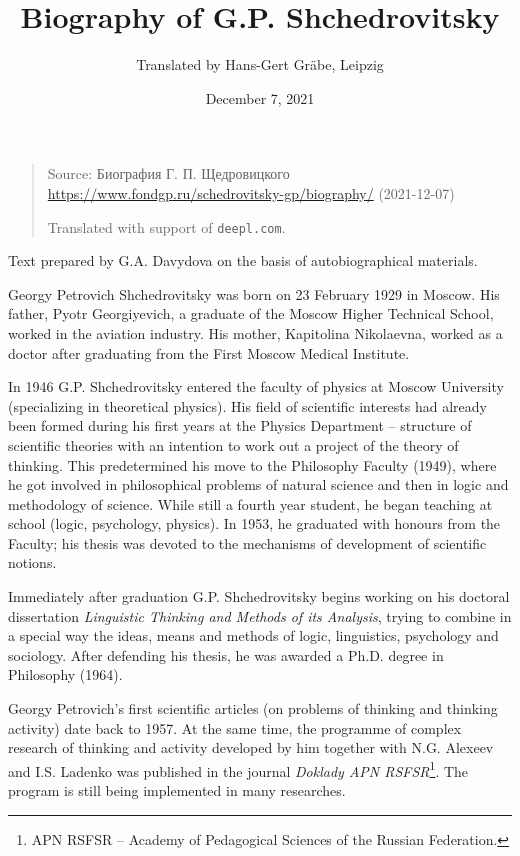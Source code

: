 \documentclass[a4paper,11pt]{article}
\title{Biography of G.P. Shchedrovitsky}
\author{Translated by Hans-Gert Gräbe, Leipzig}
\date{December 7, 2021}
\begin{document}
\maketitle

\begin{quote}
  Source: \foreignlanguage{russian}{ Биография Г. П. Щедровицкого}\\
  \url{https://www.fondgp.ru/schedrovitsky-gp/biography/} (2021-12-07)

  Translated with support of \texttt{deepl.com}.
\end{quote}

Text prepared by G.A. Davydova on the basis of autobiographical materials.

Georgy Petrovich Shchedrovitsky was born on 23 February 1929 in Moscow. His
father, Pyotr Georgiyevich, a graduate of the Moscow Higher Technical School,
worked in the aviation industry. His mother, Kapitolina Nikolaevna, worked as
a doctor after graduating from the First Moscow Medical Institute.

In 1946 G.P. Shchedrovitsky entered the faculty of physics at Moscow
University (specializing in theoretical physics). His field of scientific
interests had already been formed during his first years at the Physics
Department -- structure of scientific theories with an intention to work out a
project of the theory of thinking. This predetermined his move to the
Philosophy Faculty (1949), where he got involved in philosophical problems of
natural science and then in logic and methodology of science. While still a
fourth year student, he began teaching at school (logic, psychology, physics).
In 1953, he graduated with honours from the Faculty; his thesis was devoted to
the mechanisms of development of scientific notions.

Immediately after graduation G.P. Shchedrovitsky begins working on his
doctoral dissertation \emph{Linguistic Thinking and Methods of its Analysis},
trying to combine in a special way the ideas, means and methods of logic,
linguistics, psychology and sociology. After defending his thesis, he was
awarded a Ph.D. degree in Philosophy (1964).

Georgy Petrovich's first scientific articles (on problems of thinking and
thinking activity) date back to 1957. At the same time, the programme of
complex research of thinking and activity developed by him together with
N.G. Alexeev and I.S. Ladenko was published in the journal \emph{Doklady APN
  RSFSR}\footnote{APN RSFSR -- Academy of Pedagogical Sciences of the Russian
  Federation.}.  The program is still being implemented in many researches.
\end{document}
